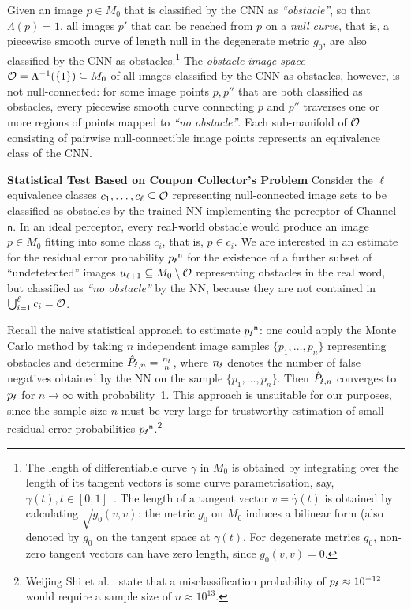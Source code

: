\documentclass[runningheads,a4paper]{llncs}
\begin{document}
Given an image $p\in M_0$ that is classified by the CNN as {\sl ``obstacle''}, so that  $\Lambda(p) =  1$, all images $p'$ that can be reached from $p$ on a {\it null curve}, that is, a piecewise smooth curve of length null in the degenerate metric $g_0$, are also classified by the CNN as  obstacles.\footnote{The length of differentiable curve $\gamma$ in $M_0$ is obtained by integrating over the length of its tangent vectors is some curve parametrisation, say, $\gamma(t), t\in[0,1]$~\cite{diffgeomCarmo}. The length of a tangent vector $v = \stackrel{\cdot}{\gamma}(t)$ is obtained by calculating $\sqrt{g_0(v,v)}$: the metric $g_0$ on $M_0$ induces a bilinear form (also denoted by $g_0$ on the tangent space at $\gamma(t)$. For degenerate metrics $g_0$, non-zero tangent vectors can have zero length, since $g_0(v,v) = 0$.} The 
\emph{obstacle image space}   ${\cal O} = \Lambda^{-1} (\{ 1\}) \subseteq M_0$ of all images classified by the CNN as
obstacles, however, 
is not null-connected: for some image points $p, p''$ that are both classified as obstacles,    every piecewise smooth curve connecting $p$ and $p''$ traverses one or more regions of points mapped to {\sl ``no obstacle''}.
Each   sub-manifold  of ${\cal O}$ consisting of pairwise null-connectible image points represents an equivalence class of the CNN.

 

 

\medskip
\noindent
{\bf Statistical Test Based on Coupon Collector's Problem}
Consider   the $\ell$ equivalence classes $c_1,\dots,c_\ell \subseteq {\cal O}$ representing null-connected image sets to be classified as obstacles by   the trained NN implementing the perceptor of  Channel~$\mathsf{n}$. 
In an ideal perceptor, every real-world obstacle would produce an image  $p\in M_0$ fitting into some class $c_i$, that is, 
$p\in c_i$.
We are interested in an estimate for the residual error probability ${p_\text{\Lightning}}^\mathsf{n}$ for the existence of a further subset of ``undetetected'' images  $u_{\ell+1}\subseteq M_0 \setminus {\cal O}$ representing obstacles in the real word, but  classified as {\sl ``no obstacle''} by the NN, because they are not contained in  $\bigcup_{i=1}^\ell c_i = {\cal O}$.

Recall the naive statistical approach to estimate   ${p_\text{\Lightning}}^\mathsf{n}$: 
one could apply the Monte Carlo method by taking $n$ independent 
image samples $\{ p_1,\dots,p_n\}$ representing obstacles and determine
$
\hat{P}_{\text{\Lightning},n} = \frac{n_\text{\Lightning}}{n}$,
where $n_\text{\Lightning}$ denotes the number of false negatives obtained by   the NN on the sample  
$\{ p_1,\dots,p_n\}$. Then $\hat{P}_{\text{\Lightning},n}$ converges to ${p_\text{\Lightning}}$ for $n \rightarrow \infty$ with probability~1. This approach is unsuitable for our purposes, since the sample size $n$ must be very large for trustworthy estimation of small residual error probabilities ${p_\text{\Lightning}}^\mathsf{n}$.\footnote{Weijing Shi et al.~\cite{DBLP:conf/iccad/ShiALYAT16} state that  
a misclassification probability of ${p_\text{\Lightning}} \approx 10^{-12}$ would require a sample size of  $n \approx 10^{13}$.}
\end{document}
